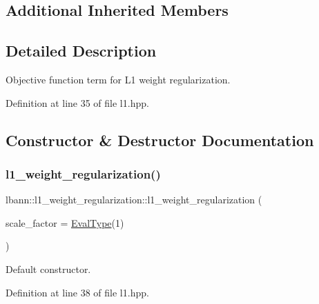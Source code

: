 \subsection*{Additional Inherited Members}


\subsection{Detailed Description}
Objective function term for L1 weight regularization. 

Definition at line 35 of file l1.\+hpp.



\subsection{Constructor \& Destructor Documentation}
\mbox{\label{classlbann_1_1l1__weight__regularization_a8416f2197baad2b9850163ecba72a4c4}} 
\subsubsection{\texorpdfstring{l1\+\_\+weight\+\_\+regularization()}{l1\_weight\_regularization()}\hspace{0.1cm}{\footnotesize\ttfamily [1/2]}}
{\footnotesize\ttfamily lbann\+::l1\+\_\+weight\+\_\+regularization\+::l1\+\_\+weight\+\_\+regularization (\begin{DoxyParamCaption}\item[{\hyperlink{base_8hpp_a3266f5ac18504bbadea983c109566867}{Eval\+Type}}]{scale\+\_\+factor = {\ttfamily \hyperlink{base_8hpp_a3266f5ac18504bbadea983c109566867}{Eval\+Type}(1)} }\end{DoxyParamCaption})\hspace{0.3cm}{\ttfamily [inline]}}

Default constructor. 

Definition at line 38 of file l1.\+hpp.


